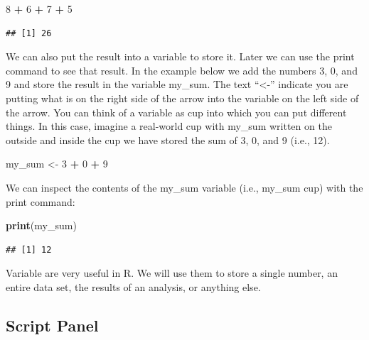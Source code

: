 \documentclass[
]{krantz}
\makeatletter
\newenvironment{Shaded}{\begin{snugshade}}{\end{snugshade}}
\newcommand{\DecValTok}[1]{\textcolor[rgb]{0.06,0.06,0.06}{#1}}
\newcommand{\KeywordTok}[1]{\textcolor[rgb]{0.27,0.27,0.27}{\textbf{#1}}}
\newcommand{\NormalTok}[1]{#1}
\newcommand{\OperatorTok}[1]{\textcolor[rgb]{0.43,0.43,0.43}{\textbf{#1}}}
\newcommand{\StringTok}[1]{\textcolor[rgb]{0.5,0.5,0.5}{#1}}
\newenvironment{kframe}{%
\medskip{}
\setlength{\fboxsep}{.8em}
 \def\at@end@of@kframe{}%
 \ifinner\ifhmode%
  \def\at@end@of@kframe{\end{minipage}}%
  \begin{minipage}{\columnwidth}%
 \fi\fi%
 \def\FrameCommand##1{\hskip\@totalleftmargin \hskip-\fboxsep
 \colorbox{shadecolor}{##1}\hskip-\fboxsep
     \hskip-\linewidth \hskip-\@totalleftmargin \hskip\columnwidth}%
 \MakeFramed {\advance\hsize-\width
   \@totalleftmargin\z@ \linewidth\hsize
   \@setminipage}}%
 {\par\unskip\endMakeFramed%
 \at@end@of@kframe}
\renewenvironment{Shaded}{\begin{kframe}}{\end{kframe}}
\makeatother
\begin{document}
\begin{Shaded}
\begin{Highlighting}[]
\DecValTok{8} \OperatorTok{+}\StringTok{ }\DecValTok{6} \OperatorTok{+}\StringTok{ }\DecValTok{7} \OperatorTok{+}\StringTok{ }\DecValTok{5}
\end{Highlighting}
\end{Shaded}

\begin{verbatim}
## [1] 26
\end{verbatim}

We can also put the result into a variable to store it. Later we can use the print command to see that result. In the example below we add the numbers 3, 0, and 9 and store the result in the variable my\_sum. The text ``\textless-'' indicate you are putting what is on the right side of the arrow into the variable on the left side of the arrow. You can think of a variable as cup into which you can put different things. In this case, imagine a real-world cup with my\_sum written on the outside and inside the cup we have stored the sum of 3, 0, and 9 (i.e., 12).

\begin{Shaded}
\begin{Highlighting}[]
\NormalTok{my_sum <-}\StringTok{ }\DecValTok{3} \OperatorTok{+}\StringTok{ }\DecValTok{0} \OperatorTok{+}\StringTok{ }\DecValTok{9}
\end{Highlighting}
\end{Shaded}

We can inspect the contents of the my\_sum variable (i.e., my\_sum cup) with the print command:

\begin{Shaded}
\begin{Highlighting}[]
\KeywordTok{print}\NormalTok{(my_sum)}
\end{Highlighting}
\end{Shaded}

\begin{verbatim}
## [1] 12
\end{verbatim}

Variable are very useful in R. We will use them to store a single number, an entire data set,
the results of an analysis, or anything else.

\hypertarget{script-panel}{%
\subsection{Script Panel}\label{script-panel}}
\end{document}
